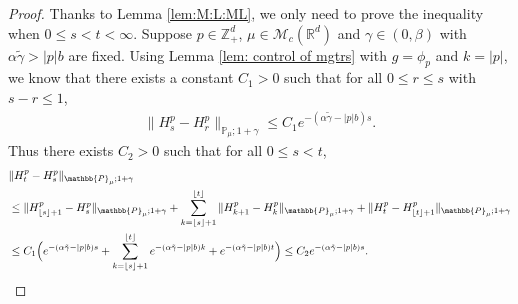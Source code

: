 \documentclass[EJP]{ejpecp} %
\begin{document}
\begin{proof}
  Thanks to Lemma \ref{lem:M:L:ML}, we only  need to prove the inequality  when $0\leq s < t<\infty$.
  Suppose $p\in \mathbb{Z}_+^d$, $\mu\in \mathcal M_c(\mathbb R^d)$ and  $\gamma \in (0,\beta)$ with $\alpha \tilde \gamma > |p|b$ are fixed.
  Using Lemma \ref{lem: control of mgtrs} with $g=\phi_p$ and $k=|p|$,  we know that there exists a constant $C_1>0$ such that for all $0\leq r\leq s $ with $s-r\leq1$,
  \begin{align}
    \|H^p_s-H^p_r\|_{\mathbb P_\mu; 1+\gamma}
    \leq  C_1 e^{-(\alpha\tilde \gamma-|p|b)s}.
  \end{align}
  Thus there exists $C_2>0$ such that for all $0\leq s<t$,
  \begin{align}
    & \|H^p_t-H^p_s\|_{\mathbb{P}_{\mu};1+\gamma} \\
    & \leq \|H^p_{\lfloor s \rfloor+1}-H^p_s\|_{\mathbb{P}_{\mu};1+\gamma}+\sum_{k=\lfloor s \rfloor+1}^{\lfloor t \rfloor}\|H^p_{k+1}-H^p_{k}\|_{\mathbb{P}_{\mu};1+\gamma}+\|H^p_t-H^p_{\lfloor t \rfloor+1}\|_{\mathbb{P}_{\mu};1+\gamma} \\
    & \leq C_1 \Big(e^{-(\alpha \tilde \gamma- |p|b) s}+\sum_{k=\lfloor s \rfloor+1}^{\lfloor t \rfloor} e^{-(\alpha \tilde \gamma- |p|b) k} + e^{-(\alpha \tilde \gamma-|p|b) t}\Big)
      \leq C_2e^{-(\alpha \tilde \gamma-|p|b)s}.
      \qedhere
  \end{align}	
\end{proof}
\end{document}
